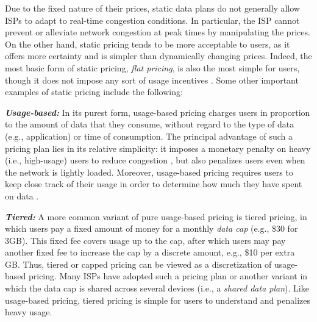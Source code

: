 Due to the fixed nature of their prices, static data plans do not generally allow ISPs to adapt to real-time congestion conditions. In particular, the ISP cannot prevent or alleviate network congestion at peak times by manipulating the prices. On the other hand, static pricing tends to be more acceptable to users, as it offers more certainty and is simpler than dynamically changing prices. Indeed, the most basic form of static pricing, \emph{flat pricing}, is also the most simple for users, though it does not impose any sort of usage incentives \cite{shakkotai}. Some other important examples of static pricing include the following:

\textbf{\emph{Usage-based:}}
In its purest form, usage-based pricing charges users in proportion to the amount of data that they consume, without regard to the type of data (e.g., application) or time of consumption. The principal advantage of such a pricing plan lies in its relative simplicity: it imposes a monetary penalty on heavy (i.e., high-usage) users to reduce congestion \cite{hande,Li}, but also penalizes users even when the network is lightly loaded. Moreover, usage-based pricing requires users to keep close track of their usage in order to determine how much they have spent on data \cite{walrand}.

\textbf{\emph{Tiered:}}
A more common variant of pure usage-based pricing is tiered pricing, in which users pay a fixed amount of money for a monthly \emph{data cap} (e.g., \$30 for 3GB). This fixed fee covers usage up to the cap, after which users may pay another fixed fee to increase the cap by a discrete amount, e.g., \$10 per extra GB. Thus, tiered or capped pricing can be viewed as a discretization of usage-based pricing. Many ISPs have adopted such a pricing plan or another variant in which the data cap is shared across several devices (i.e., a \emph{shared data plan}). Like usage-based pricing, tiered pricing is simple for users to understand and penalizes heavy usage. %

